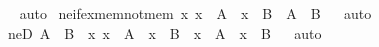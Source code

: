 \begin{isabellebody}
\isadelimproof
\ %
\endisadelimproof
%
\isatagproof
{}\isamarkupfalse%
\ auto%
\endisatagproof
{\isafoldproof}%
%
\isadelimproof
%
\endisadelimproof
\isanewline
\isanewline
{}\isamarkupfalse%
\ ne{\isacharunderscore}{\kern0pt}if{\isacharunderscore}{\kern0pt}ex{\isacharunderscore}{\kern0pt}mem{\isacharunderscore}{\kern0pt}not{\isacharunderscore}{\kern0pt}mem{\isacharcolon}{\kern0pt}\ {\isachardoublequoteopen}{\isasymexists}x{\isachardot}{\kern0pt}\ x\ {\isasymin}\ A\ {\isasymand}\ x\ {\isasymnotin}\ B\ {\isasymLongrightarrow}\ A\ {\isasymnoteq}\ B{\isachardoublequoteclose}%
\isadelimproof
\ %
\endisadelimproof
%
\isatagproof
{}\isamarkupfalse%
\ auto%
\endisatagproof
{\isafoldproof}%
%
\isadelimproof
%
\endisadelimproof
\isanewline
\isanewline
{}\isamarkupfalse%
\ neD{\isacharcolon}{\kern0pt}\ {\isachardoublequoteopen}A\ {\isasymnoteq}\ B\ {\isasymLongrightarrow}\ {\isasymexists}x{\isachardot}{\kern0pt}\ {\isacharparenleft}{\kern0pt}x\ {\isasymin}\ A\ {\isasymand}\ x\ {\isasymnotin}\ B{\isacharparenright}{\kern0pt}\ {\isasymor}\ {\isacharparenleft}{\kern0pt}x\ {\isasymnotin}\ A\ {\isasymand}\ x\ {\isasymin}\ B{\isacharparenright}{\kern0pt}{\isachardoublequoteclose}%
\isadelimproof
\ %
\endisadelimproof
%
\isatagproof
{}\isamarkupfalse%
\ auto%
\endisatagproof
{\isafoldproof}%
%
\isadelimproof
%
\endisadelimproof
\isanewline
%
\isadelimtheory
\isanewline
%
\endisadelimtheory
%
\isatagtheory
{}\isamarkupfalse%
%
\endisatagtheory
{\isafoldtheory}%
%
\isadelimtheory
%
\endisadelimtheory
%
\end{isabellebody}%
\endinput
